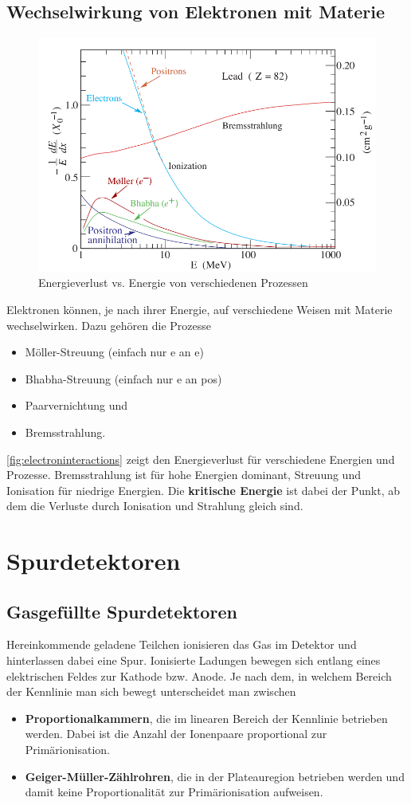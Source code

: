 \subsection{Wechselwirkung von Elektronen mit Materie}
\begin{figure}
	\centering
	\includegraphics[width=.7\textwidth]{./img/electroninteractions.jpg}
	\caption{Energieverlust vs. Energie von verschiedenen Prozessen}
	\label{fig:electroninteractions}
\end{figure}
Elektronen können, je nach ihrer Energie, auf verschiedene Weisen mit Materie wechselwirken.
Dazu gehören die Prozesse
\begin{itemize}
	\item Möller-Streuung (einfach nur e an e)
	\item Bhabha-Streuung (einfach nur e an pos)
	\item Paarvernichtung und
	\item Bremsstrahlung.
\end{itemize}
\autoref{fig:electroninteractions} zeigt den Energieverlust für verschiedene Energien und Prozesse.
Bremsstrahlung ist für hohe Energien dominant, Streuung und Ionisation für niedrige Energien.
Die \textbf{kritische Energie} ist dabei der Punkt, ab dem die Verluste durch Ionisation und Strahlung gleich sind.

\section{Spurdetektoren}
\subsection{Gasgefüllte Spurdetektoren}
Hereinkommende geladene Teilchen ionisieren das Gas im Detektor und hinterlassen dabei eine Spur.
Ionisierte Ladungen bewegen sich entlang eines elektrischen Feldes zur Kathode bzw. Anode.
Je nach dem, in welchem Bereich der Kennlinie man sich bewegt unterscheidet man zwischen
\begin{itemize}
	\item \textbf{Proportionalkammern}, die im linearen Bereich der Kennlinie betrieben werden. Dabei ist die Anzahl der Ionenpaare proportional zur Primärionisation.
	\item \textbf{Geiger-Müller-Zählrohren}, die in der Plateauregion betrieben werden und damit keine Proportionalität zur Primärionisation aufweisen.
\end{itemize}
